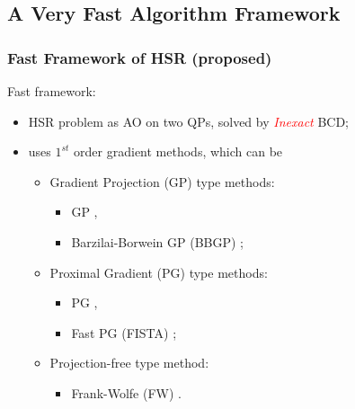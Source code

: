 \documentclass[10pt,mathserif]{beamer}
\begin{document}
\subsection{A Very Fast Algorithm Framework}
    \begin{frame}
        \frametitle{Fast Framework of HSR (proposed)}
        Fast framework:
        \begin{itemize}
            \item HSR problem as AO on two QPs, solved by \textcolor{red}{\textit{Inexact}} BCD;
            \item uses $1^{st}$ order gradient methods, which can be
                  \begin{itemize}
                      \item Gradient Projection (GP) type methods:
                            \begin{itemize}
                                \item GP \cite{NONLINEAR_PRGM},
                                \item Barzilai-Borwein GP (BBGP) \cite{BARZILAI_BORWEIN_ALGORITHM};
                            \end{itemize}
                      \item Proximal Gradient (PG) type methods:
                            \begin{itemize}
                                \item PG \cite{PROX_ALGO},
                                \item Fast PG (FISTA) \cite{NESTEROV_FISTA,A_FAST_ITERA_SHRINK_THRESH_ALGO};
                            \end{itemize}
                      \item Projection-free type method:
                            \begin{itemize}
                                \item Frank-Wolfe (FW) \cite{FRANKWOLFE_AN_ALGO_FOR_QUAD_PRGM}.
                            \end{itemize}
                  \end{itemize}
        \end{itemize}
    \end{frame}
\end{document}
